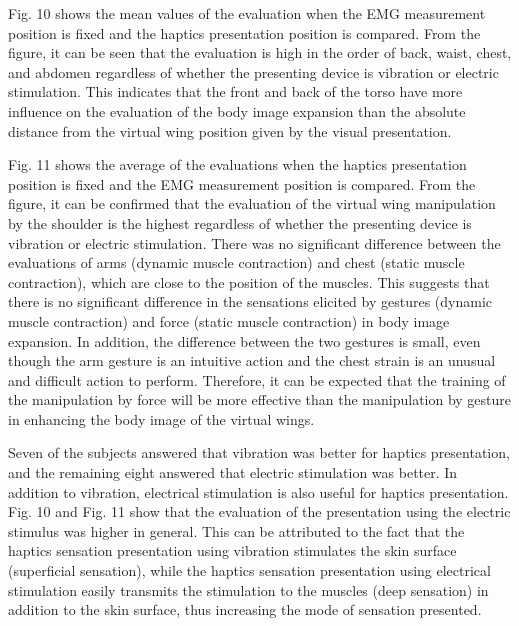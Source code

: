\documentclass[letterpaper, 10 pt, conference]{ieeeconf}  %
\begin{document}

                Fig. 10 shows the mean values of the evaluation when the EMG measurement position is fixed and the haptics presentation position is compared.
                From the figure, it can be seen that the evaluation is high in the order of back, waist, chest, and abdomen regardless of whether the presenting device is vibration or electric stimulation.
                This indicates that the front and back of the torso have more influence on the evaluation of the body image expansion than the absolute distance from the virtual wing position given by the visual presentation.

                Fig. 11 shows the average of the evaluations when the haptics presentation position is fixed and the EMG measurement position is compared.
                From the figure, it can be confirmed that the evaluation of the virtual wing manipulation by the shoulder is the highest regardless of whether the presenting device is vibration or electric stimulation. 
                There was no significant difference between the evaluations of arms (dynamic muscle contraction) and chest (static muscle contraction), which are close to the position of the muscles. 
                This suggests that there is no significant difference in the sensations elicited by gestures (dynamic muscle contraction) and force (static muscle contraction) in body image expansion. 
                In addition, the difference between the two gestures is small, even though the arm gesture is an intuitive action and the chest strain is an unusual and difficult action to perform. 
                Therefore, it can be expected that the training of the manipulation by force will be more effective than the manipulation by gesture in enhancing the body image of the virtual wings.

                Seven of the subjects answered that vibration was better for haptics presentation, and the remaining eight answered that electric stimulation was better. 
                In addition to vibration, electrical stimulation is also useful for haptics presentation. 
                Fig. 10 and Fig. 11 show that the evaluation of the presentation using the electric stimulus was higher in general. 
                This can be attributed to the fact that the haptics sensation presentation using vibration stimulates the skin surface (superficial sensation), while the haptics sensation presentation using electrical stimulation easily transmits the stimulation to the muscles (deep sensation) in addition to the skin surface, thus increasing the mode of sensation presented.
\end{document}
